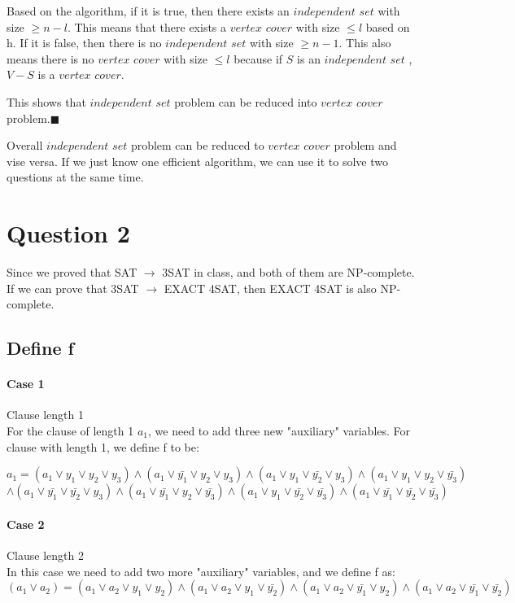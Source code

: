 \documentclass{article}
\begin{document}
Based on the algorithm, if it is true, then there exists an $independent$ $set$ with size $\geq n-l$. This means that there exists a $vertex$ $cover$ with size 
$\leq l$ based on h. If it is false, then there is no $independent$ $set$ with size $\geq n-1$. This also means there is no $vertex$ $cover$ with size 
$\leq l$ because if $S$ is an $independent$ $set$ , $V-S$ is a $vertex$ $cover$.

This shows that $independent$ $set$ problem can be reduced into $vertex$ $cover$ problem.$\blacksquare$

Overall $independent$ $set$ problem can be reduced to $vertex$ $cover$ problem and vise versa. If we just know one efficient algorithm, we can use it to solve 
two questions at the same time.



\section*{Question 2}
Since we proved that SAT $\rightarrow$ 3SAT in class, and both of them are NP-complete.
If we can prove that 3SAT $\rightarrow$ EXACT 4SAT, then EXACT 4SAT
is also NP-complete. 
\subsection*{Define f}
\paragraph*{Case 1} Clause length 1\\

For the clause of length 1 $a_1$, we need to add three new "auxiliary" variables. For clause with length 1, we define 
f to be:


$$a_1 = (a_1\vee y_1 \vee y_2 \vee y_3) \wedge (a_1\vee \bar{y_1} \vee y_2 \vee y_3) \wedge (a_1\vee y_1 \vee \bar{y_2} \vee y_3) \wedge (a_1\vee y_1 \vee y_2 \vee \bar{y_3})$$
$$\wedge (a_1\vee \bar{y_1} \vee \bar{y_2} \vee y_3) \wedge (a_1\vee \bar{y_1} \vee y_2 \vee \bar{y_3}) \wedge (a_1\vee y_1 \vee \bar{y_2} \vee \bar{y_3}) \wedge (a_1\vee \bar{y_1} \vee \bar{y_2} \vee \bar{y_3}) $$

\paragraph*{Case 2} Clause length 2\\
In this case we need to add two more "auxiliary" variables, and we define f as:
$$(a_1 \vee a_2) = (a_1 \vee a_2 \vee y_1 \vee y_2) \wedge (a_1 \vee a_2 \vee y_1 \vee \bar{y_2}) \wedge (a_1 \vee a_2 \vee \bar{y_1} \vee y_2) \wedge (a_1 \vee a_2 \vee \bar{y_1} \vee \bar{y_2})$$
\end{document}
